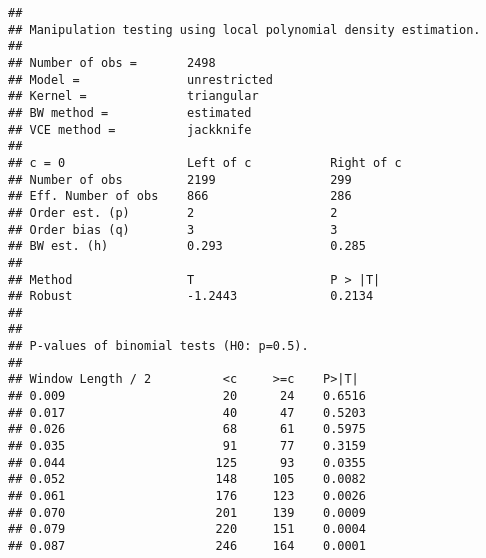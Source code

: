 \documentclass[
]{article}
\newenvironment{Shaded}{\begin{snugshade}}{\end{snugshade}}
\newcommand{\AttributeTok}[1]{\textcolor[rgb]{0.13,0.29,0.53}{#1}}
\newcommand{\CommentTok}[1]{\textcolor[rgb]{0.56,0.35,0.01}{\textit{#1}}}
\newcommand{\DecValTok}[1]{\textcolor[rgb]{0.00,0.00,0.81}{#1}}
\newcommand{\FunctionTok}[1]{\textcolor[rgb]{0.13,0.29,0.53}{\textbf{#1}}}
\newcommand{\NormalTok}[1]{#1}
\newcommand{\OtherTok}[1]{\textcolor[rgb]{0.56,0.35,0.01}{#1}}
\newcommand{\SpecialCharTok}[1]{\textcolor[rgb]{0.81,0.36,0.00}{\textbf{#1}}}
\newcommand{\StringTok}[1]{\textcolor[rgb]{0.31,0.60,0.02}{#1}}
\begin{document}
\begin{Shaded}
\end{Shaded}

\begin{verbatim}
## 
## Manipulation testing using local polynomial density estimation.
## 
## Number of obs =       2498
## Model =               unrestricted
## Kernel =              triangular
## BW method =           estimated
## VCE method =          jackknife
## 
## c = 0                 Left of c           Right of c          
## Number of obs         2199                299                 
## Eff. Number of obs    866                 286                 
## Order est. (p)        2                   2                   
## Order bias (q)        3                   3                   
## BW est. (h)           0.293               0.285               
## 
## Method                T                   P > |T|             
## Robust                -1.2443             0.2134              
## 
## 
## P-values of binomial tests (H0: p=0.5).
## 
## Window Length / 2          <c     >=c    P>|T|
## 0.009                      20      24    0.6516
## 0.017                      40      47    0.5203
## 0.026                      68      61    0.5975
## 0.035                      91      77    0.3159
## 0.044                     125      93    0.0355
## 0.052                     148     105    0.0082
## 0.061                     176     123    0.0026
## 0.070                     201     139    0.0009
## 0.079                     220     151    0.0004
## 0.087                     246     164    0.0001
\end{verbatim}
\end{document}
